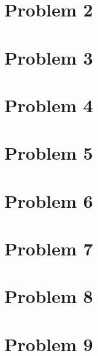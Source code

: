 \documentclass[11pt]{article}
\begin{document}
\section*{Problem 2}


\section*{Problem 3}


\section*{Problem 4}


\section*{Problem 5}


\section*{Problem 6}


\section*{Problem 7}


\section*{Problem 8}


\section*{Problem 9}
\end{document}

